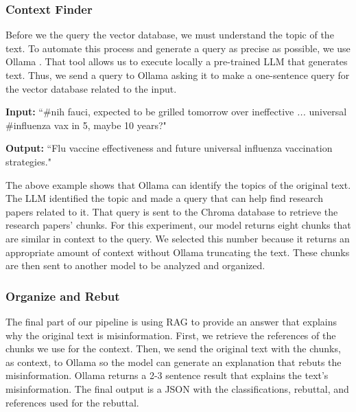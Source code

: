 \subsubsection{Context Finder}
Before we the query the vector database, we must understand the topic of the text. To automate this process and generate a query as precise as possible, we use Ollama \cite{ollama}. That tool allows us to execute locally a pre-trained LLM that generates text. Thus, we send a query to Ollama asking it to make a one-sentence query for the vector database related to the input.

{\footnotesize %
\begin{tcolorbox}[colback=gray!5,colframe=black!50,boxrule=0.4pt,arc=2pt,left=0.5mm,right=0.5mm,top=0.1mm,bottom=0.1mm,title=Example]
\textbf{Input:}  
``\#nih fauci, expected to be grilled tomorrow over ineffective \textit{...} universal \#influenza vax in 5, maybe 10 years?"

\vspace{0.25em}
\textbf{Output:}  
``Flu vaccine effectiveness and future universal influenza vaccination strategies."
\end{tcolorbox}
}
\indent The above example shows that Ollama can identify the topics of the original text. The LLM identified the topic and made a query that can help find research papers related to it.
That query is sent to the Chroma database to retrieve the research papers' chunks. For this experiment, our model returns eight chunks that are similar in context to the query. We selected
this number because it returns an appropriate amount of context without Ollama truncating the text. These chunks are then sent to another model to be analyzed and organized.

\subsubsection{Organize and Rebut}
The final part of our pipeline is using RAG to provide an answer that explains why the original text is misinformation. First, we retrieve the references of the chunks we use for the context. Then, we send the original text with the chunks, as context, to Ollama so the model can generate an explanation that rebuts the misinformation. Ollama returns a 2-3 sentence result that explains the text’s misinformation. The final output is a JSON with the classifications, rebuttal, and references used for the rebuttal.


